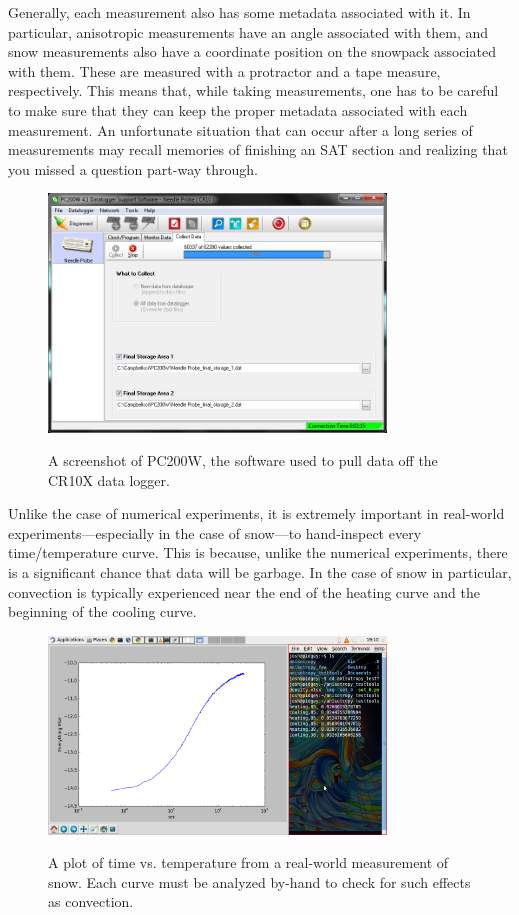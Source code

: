 Generally, each measurement also has some metadata associated with it. In
particular, anisotropic measurements have an angle associated with them, and
snow measurements also have a coordinate position on the snowpack associated
with them. These are measured with a protractor and a tape measure,
respectively. This means that, while taking measurements, one has to be careful
to make sure that they can keep the proper metadata associated with each
measurement. An unfortunate situation that can occur after a long series of
measurements may recall memories of finishing an SAT section and realizing that
you missed a question part-way through. 

\begin{figure}[h]
\centering
\includegraphics[width=0.8\textwidth]{fig/pc200w.png}
\label{fig:pc200w}
\caption{A screenshot of PC200W, the software used to pull data off the CR10X data logger.}
\end{figure}

Unlike the case of numerical experiments, it is extremely important in
real-world experiments---especially in the case of snow---to hand-inspect every
time/temperature curve. This is because, unlike the numerical experiments, there
is a significant chance that data will be garbage. In the case of snow in
particular, convection is typically experienced near the end of the heating
curve and the beginning of the cooling curve.

\begin{figure}[h]
\centering
\includegraphics[width=0.8\textwidth]{fig/measurement_graph.png}
\label{fig:meas_graph}
\caption{A plot of time vs. temperature from a real-world measurement of snow.
Each curve must be analyzed by-hand to check for such effects as convection.}
\end{figure}


